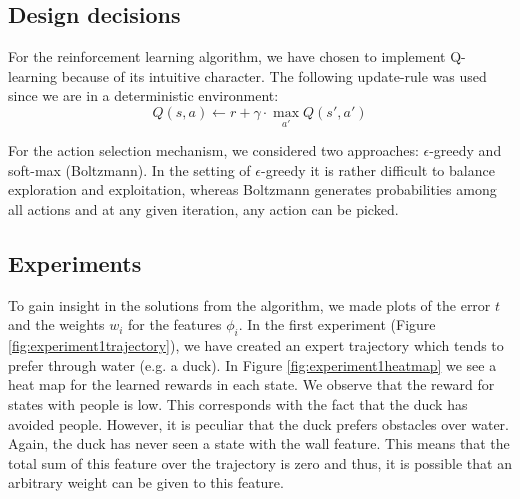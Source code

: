 \documentclass[10pt,a4paper,twocolumn]{article}
\begin{document}
\subsection{Design decisions}
For the reinforcement learning algorithm, we have chosen to implement Q-learning because of its intuitive character. The following update-rule was used since we are in a deterministic environment:
$$Q(s,a) \gets r + \gamma\cdot \max\limits_{a'}Q(s',a')$$

For the action selection mechanism, we considered two approaches: $\epsilon$-greedy and soft-max (Boltzmann). In the setting of $\epsilon$-greedy it is rather difficult to balance exploration and exploitation, whereas Boltzmann generates probabilities among all actions and at any given iteration, any action can be picked.


\subsection{Experiments}
To gain insight in the solutions from the algorithm, we made plots of the error $t$ and the weights $w_i$ for the features $\phi_i$. In the first experiment (Figure \ref{fig:experiment1trajectory}), we have created an expert trajectory which tends to prefer through water (e.g. a duck). In Figure \ref{fig:experiment1heatmap} we see a heat map for the learned rewards in each state. We observe that the reward for states with people is low. This corresponds with the fact that the duck has avoided people. However, it is peculiar that the duck prefers obstacles over water. Again, the duck has never seen a state with the wall feature. This means that the total sum of this feature over the trajectory is zero and thus, it is possible that an arbitrary weight can be given to this feature.
\end{document}
